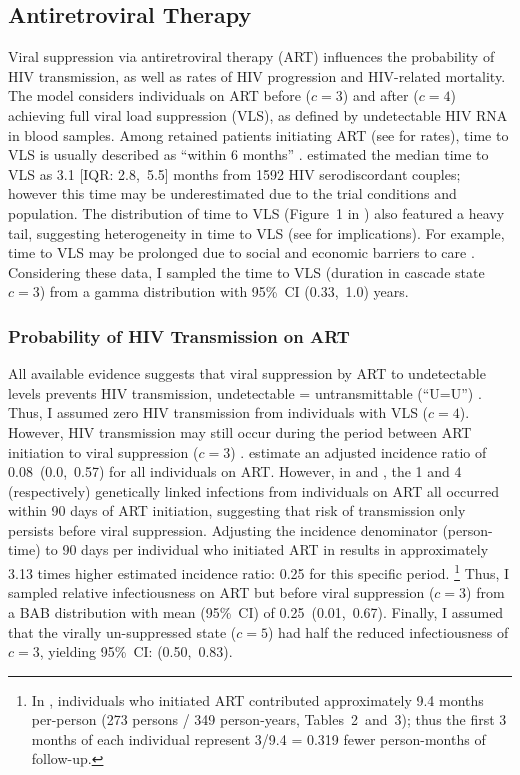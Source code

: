 \subsection{Antiretroviral Therapy}\label{model.par.art}
Viral suppression via antiretroviral therapy (ART) influences
the probability of HIV transmission, as well as rates of HIV progression and HIV-related mortality.
The model considers individuals on ART before ($c=3$) and after ($c=4$)
achieving full viral load suppression (VLS), as defined by undetectable HIV RNA in blood samples.
Among retained patients initiating ART (see  for rates), time to VLS
is usually described as ``within 6 months'' \cite{Thompson2012}.
\citet{Mujugira2016} estimated the median time to VLS as 3.1 [IQR: 2.8,~5.5] months
from 1592 HIV serodiscordant couples;
however this time may be underestimated due to the trial conditions and population.
The distribution of time to VLS (Figure~1 in \cite{Mujugira2016}) also featured a heavy tail,
suggesting heterogeneity in time to VLS (see  for implications).
For example, time to VLS may be prolonged due to social and economic barriers to care
\cite{Dlamini-Simelane2017,Horter2019}.
Considering these data, I sampled the time to VLS (duration in cascade state $c=3$)
from a gamma distribution with 95\%~CI (0.33,~1.0) years.
\subsubsection{Probability of HIV Transmission on ART}\label{model.par.art.beta}
All available evidence suggests that viral suppression by ART to undetectable levels
prevents HIV transmission, \ie undetectable = untransmittable (``U=U'') \cite{Eisinger2019uu}.
Thus, I assumed zero HIV transmission from individuals with VLS ($c=4$).
However, HIV transmission may still occur
during the period between ART initiation to viral suppression ($c=3$) \cite{Mujugira2016}.
\citet{Donnell2010} estimate an adjusted incidence ratio of 0.08~(0.0,~0.57) for all individuals on ART.
However, in \cite{Donnell2010} and \cite{Cohen2016}, the 1 and 4 (respectively)
genetically linked infections from individuals on ART all occurred within 90 days of ART initiation,
suggesting that risk of transmission only persists before viral suppression.
Adjusting the incidence denominator (person-time)
to 90 days per individual who initiated ART in \cite{Donnell2010}
results in approximately 3.13 times higher estimated incidence ratio: 0.25 for this specific period.%
\footnote{In \cite{Donnell2010}, individuals who initiated ART contributed
  approximately 9.4 months per-person (273 persons / 349 person-years, Tables~2~and~3);
  thus the first 3 months of each individual represent
  3/9.4 = 0.319 fewer person-months of follow-up.}
Thus, I sampled relative infectiousness on ART but before viral suppression ($c=3$)
from a BAB distribution with mean (95\%~CI) of 0.25~(0.01,~0.67).
Finally, I assumed that the virally un-suppressed state ($c=5$) had
half the reduced infectiousness of $c=3$, yielding 95\%~CI: (0.50,~0.83).
